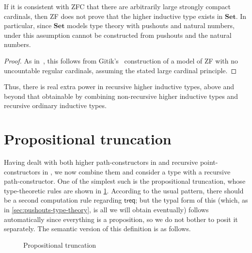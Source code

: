 \documentclass{amsart}
\let\sec\S
\let\S\cS
\def\tr{\mathsf{tr}}
\def\treq{\mathsf{treq}}
\def\trrec{\mathsf{trrec}}
\let\type\fibtype
\renewcommand{\idover}[4][]{\fId_{#1}^{#4}(#2,#3)}
\begin{document}
\begin{cor}
  If it is consistent with ZFC that there are arbitrarily large strongly compact cardinals, then ZF does not prove that the higher inductive type \iF exists in $\mathbf{Set}$.
  In particular, since $\mathbf{Set}$ models type theory with pushouts and natural numbers, under this assumption \iF cannot be constructed from pushouts and the natural numbers.
\end{cor}
\begin{proof}
  As in~\cite[\sec9]{blass:freealg}, this follows from Gitik's~\cite{gitik:unc-sing} construction of a model of ZF with no uncountable regular cardinals, assuming the stated large cardinal principle.
\end{proof}

Thus, there is real extra power in recursive higher inductive types, above and beyond that obtainable by combining non-recursive higher inductive types and recursive ordinary inductive types.


\section{Propositional truncation}
\label{sec:prop-trunc}

Having dealt with both higher path-constructors in  and recursive point-constructors in , we now combine them and consider a type with a recursive path-constructor.
One of the simplest such is the propositional truncation, whose type-theoretic rules are shown in \cref{fig:proptrunc}.
According to the usual pattern, there should be a second computation rule regarding $\treq$; but the typal form of this (which, as in \cref{sec:pushouts-type-theory}, is all we will obtain eventually) follows automatically since everything is a proposition, so we do not bother to posit it separately.
The semantic version of this definition is as follows.

\begin{figure}
  \centering
  \caption{Propositional truncation}
  \label{fig:proptrunc}
\end{figure}
\end{document}
